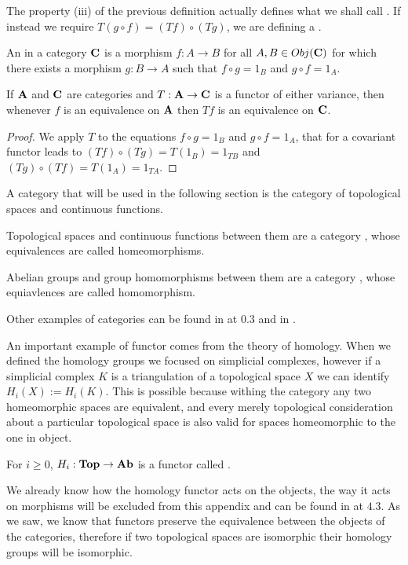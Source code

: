 \documentclass[../1.tex]{subfiles}
\begin{document}
    The property (iii) of the previous definition actually defines what we shall call .
    If instead we require $T(g \circ f) = (Tf) \circ (Tg)$, we are defining a .

    \begin{defn}
        An  in a category $\textbf{C}$ is a morphism $f : A \to B$ for all $A,B \in Obj(\textbf{C})$ for which there exists a morphism $g : B \to A$ such that
        $ f \circ g = 1_B$ and $ g \circ f = 1_A$.
    \end{defn}

    \begin{thm}
        If $\textbf{A}$ and $\textbf{C}$ are categories and $T : \textbf{A} \to \textbf{C}$ is a functor of either variance, then whenever $f$ is 
        an equivalence on $\textbf{A}$ then $Tf$ is an equivalence on $\textbf{C}$.
    \end{thm}
    \begin{proof}
        We apply $T$ to the equations $ f \circ g = 1_B$ and $ g \circ f = 1_A$, that for a covariant functor leads to 
        $(Tf) \circ (Tg) = T(1_B) = 1_{TB}$ and $(Tg) \circ (Tf) = T(1_A) = 1_{TA}$.
    \end{proof}

    A category that will be used in the following section is the category of topological spaces and continuous functions.

    \begin{prop}
        Topological spaces and continuous functions between them are a category , whose equivalences are called homeomorphisms.
    \end{prop}

    {\color{blue}
    \begin{prop}
        Abelian groups and group homomorphisms between them are a category , whose equiavlences are called homomorphism.
    \end{prop}

    Other examples of categories can be found in \cite{rotman} at 0.3 and in \cite{mclane}.

    An important example of functor comes from the theory of homology.
    When we defined the homology groups we focused on simplicial complexes, however if a simplicial complex $K$ is a triangulation of a topological space $X$
    we can identify $H_i(X) := H_i(K)$. This is possible because withing the category  any two homeomorphic spaces are equivalent, and every merely topological consideration
    about a particular topological space is also valid for spaces homeomorphic to the one in object.

    \begin{thm}
        For $i \geq 0$, $H_i : \textbf{Top} \to \textbf{Ab}$ is a functor called .
    \end{thm}

    We already know how the homology functor acts on the objects, the way it acts on morphisms will be excluded from this appendix and can be found in 
    \cite{rotman} at $4.3$. As we saw, we know that functors preserve the equivalence between the objects of the categories, therefore if two topological spaces are isomorphic
    their homology groups will be isomorphic.}
\end{document}
